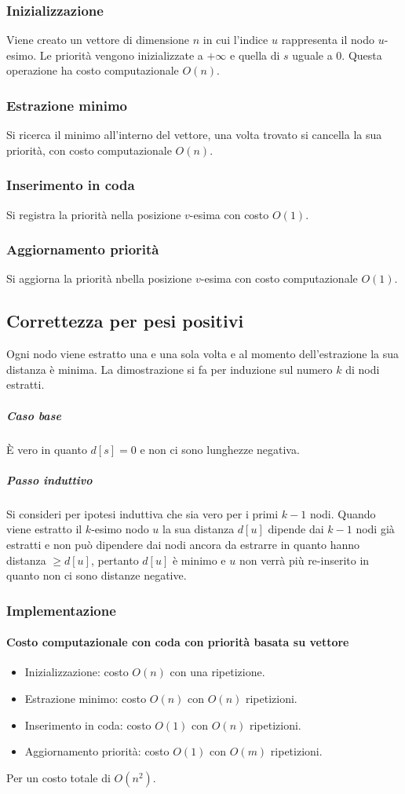 \subsubsection{Inizializzazione}
Viene creato un vettore di dimensione $n$ in cui l'indice $u$ rappresenta il nodo $u$-esimo. Le priorit\`a vengono inizializzate a $+\infty$ e quella di $s$ uguale a $0$. Questa 
operazione ha costo computazionale $O(n)$.
\subsubsection{Estrazione minimo}
Si ricerca il minimo all'interno del vettore, una volta trovato si cancella la sua priorit\`a, con costo computazionale $O(n)$. 
\subsubsection{Inserimento in coda}
Si registra la priorit\`a nella posizione $v$-esima con costo $O(1)$.
\subsubsection{Aggiornamento priorit\`a}
Si aggiorna la priorit\`a nbella posizione $v$-esima con costo computazionale $O(1)$.
\subsection{Correttezza per pesi positivi}
Ogni nodo viene estratto una e una sola volta e al momento dell'estrazione la sua distanza \`e minima. La dimostrazione si fa per induzione sul numero $k$ di nodi estratti.
\subparagraph{Caso base}
\`E vero in quanto $d[s]=0$ e non ci sono lunghezze negativa.
\subparagraph{Passo induttivo}
Si consideri per ipotesi induttiva che sia vero per i primi $k-1$ nodi. Quando viene estratto il $k$-esimo nodo $u$ la sua distanza $d[u]$ dipende dai $k-1$ nodi gi\`a estratti e non 
pu\`o dipendere dai nodi ancora da estrarre in quanto hanno distanza $\ge d[u]$, pertanto $d[u]$ \`e minimo e $u$ non verr\`a pi\`u re-inserito in quanto non ci sono distanze negative.
\subsubsection{Implementazione}

\paragraph{Costo computazionale con coda con priorit\`a basata su vettore}
\begin{itemize}
	\item Inizializzazione: costo $O(n)$ con una ripetizione.
	\item Estrazione minimo: costo $O(n)$ con $O(n)$ ripetizioni.
	\item Inserimento in coda: costo $O(1)$ con $O(n)$ ripetizioni.
	\item Aggiornamento priorit\`a: costo $O(1)$ con $O(m)$ ripetizioni.
\end{itemize}
Per un costo totale di $O(n^2)$.
